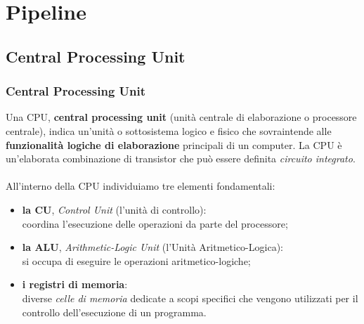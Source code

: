 \section[Pipeline]{Pipeline}
\label{sec:pipeline}


\subsection[Central Processing Unit]{Central Processing Unit}
\begin{frame}
	\frametitle{Central Processing Unit}
	
		Una CPU, \textbf{central processing unit} (unità centrale di elaborazione o processore centrale), indica un'unità o sottosistema logico e fisico che sovraintende alle \textbf{funzionalità logiche di elaborazione} principali di un computer.
		La CPU è un'elaborata combinazione di transistor che può essere definita \textit{circuito integrato}.\\~\\
		\pause
		All'interno della CPU individuiamo tre elementi fondamentali:
		\begin{itemize}
			\item \textbf{la CU}, \textit{Control Unit} (l’unità di controllo):\\
			coordina l'esecuzione delle operazioni da parte del processore;
			\item \textbf{la ALU}, \textit{Arithmetic-Logic Unit} (l’Unità Aritmetico-Logica):\\
			si occupa di eseguire le operazioni aritmetico-logiche;
			\item \textbf{i registri di memoria}:\\
			diverse \textit{celle di memoria} dedicate a scopi specifici che vengono utilizzati per il controllo dell'esecuzione di un programma.
		\end{itemize}
	
\end{frame}


